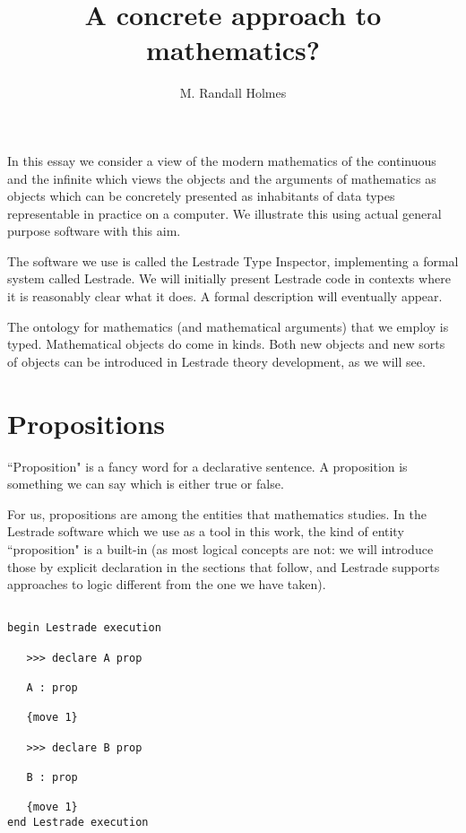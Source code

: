 \documentclass[12pt]{article}
\title{A concrete approach to mathematics?}
\author{M. Randall Holmes}
\begin{document}
\maketitle

\tableofcontents

In this essay we consider a view of the modern mathematics of the continuous and the infinite which views the objects and the arguments of mathematics as objects which can be concretely presented as inhabitants of data types representable in practice on a computer.   We illustrate this using actual general purpose software with this aim.

The software we use is called the Lestrade Type Inspector, implementing a formal system called Lestrade.  We will initially present Lestrade code in contexts where it is reasonably clear what it does.  A formal description will eventually appear.

The ontology for mathematics (and mathematical arguments) that we employ is typed.  Mathematical objects do come in kinds.  Both new objects and new sorts of objects can be introduced in Lestrade theory development, as we will see.

\section{Propositions}

``Proposition" is a fancy word for a declarative sentence.  A proposition is something we can say which is either true or false.

For us, propositions are among the entities that mathematics studies.  In the Lestrade software which we use as a tool in this work, the kind of entity ``proposition" is a built-in (as most logical concepts are not:  we will introduce those by explicit declaration in the sections that follow, and Lestrade supports approaches to logic different from the one we have taken).

\begin{verbatim}

begin Lestrade execution

   >>> declare A prop

   A : prop

   {move 1}

   >>> declare B prop

   B : prop

   {move 1}
end Lestrade execution

\end{verbatim}
\end{document}
